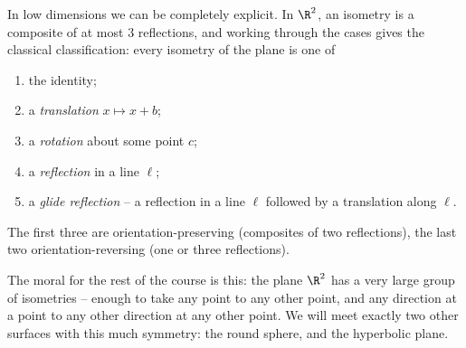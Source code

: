 In low dimensions we can be completely explicit. In $\R^2$, an isometry is a composite of at most $3$ reflections, and working through the cases gives the classical classification: every isometry of the plane is one of
\begin{enumerate}[label=(\roman*)]
    \item the identity;
    \item a \emph{translation} $x \mapsto x + b$;
    \item a \emph{rotation} about some point $c$;
    \item a \emph{reflection} in a line $\ell$;
    \item a \emph{glide reflection} -- a reflection in a line $\ell$ followed by a translation along $\ell$.
\end{enumerate}
The first three are orientation-preserving (composites of two reflections), the last two orientation-reversing (one or three reflections).
\begin{center}
\end{center}

The moral for the rest of the course is this: the plane $\R^2$ has a very large group of isometries -- enough to take any point to any other point, and any direction at a point to any other direction at any other point. We will meet exactly two other surfaces with this much symmetry: the round sphere, and the hyperbolic plane.


